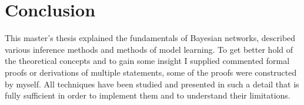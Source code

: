 \documentclass[english,cover]{fitthesis} %
\begin{document}

\chapter{Conclusion}
This master's thesis explained the fundamentals of Bayesian networks, described various inference methods and methods of model learning. To get better hold of the theoretical concepts and to gain some insight I supplied commented formal proofs or derivations of multiple statements, some of the proofs were constructed by myself. All techniques have been studied and presented in such a detail that is fully sufficient in order to implement them and to understand their limitations.
\end{document}
